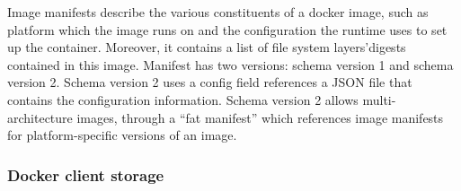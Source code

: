 %
%
Image manifests describe the various constituents of a docker image, such as platform which the image runs on and the configuration the runtime uses to set up the container.
%
Moreover, it contains a list of file system layers'digests contained in this image.
%
Manifest has two versions: schema version 1 and schema version 2.
%
Schema version 2 uses a config field references a JSON file that contains the configuration information.
%
Schema version 2 allows multi-architecture images, through a “fat manifest” which references image manifests for platform-specific versions of an image. 















\subsubsection{Docker client storage}

